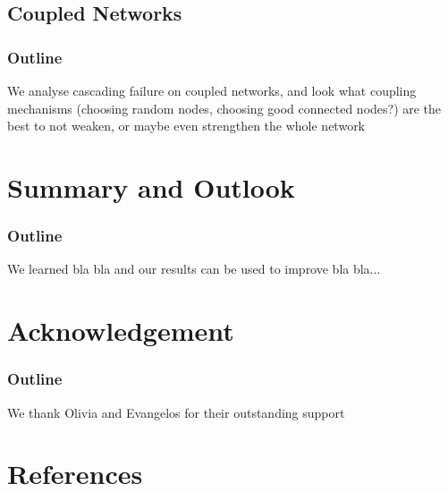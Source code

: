 \documentclass[11pt]{article}
\begin{document}
\subsection{Coupled Networks}
\subsubsection{Outline}
We analyse cascading failure on coupled networks, and look what coupling mechanisms (choosing random nodes, choosing good connected nodes?) are the best to not weaken, or maybe even strengthen the whole network
\section{Summary and Outlook}
\subsubsection{Outline}
We learned bla bla and our results can be used to improve bla bla...
\section{Acknowledgement}
\subsubsection{Outline}
We thank Olivia and Evangelos for their outstanding support
\section{References}
\nocite{*}


\end{document}
